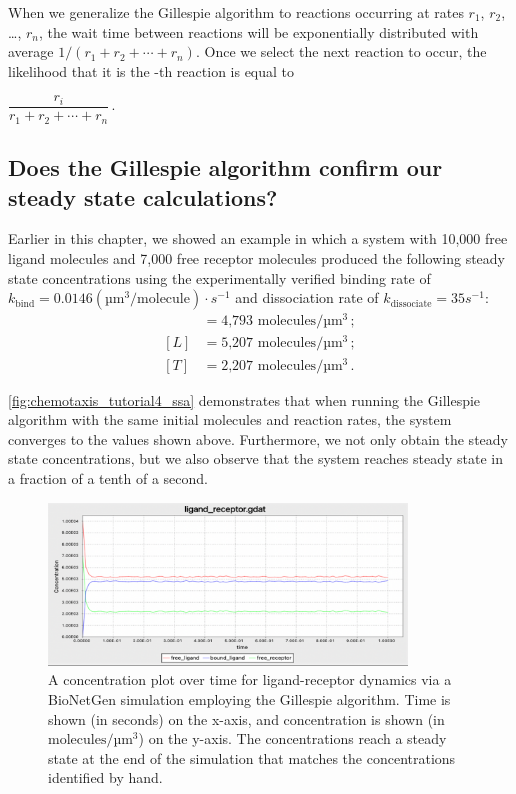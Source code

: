 When we generalize the Gillespie algorithm to  reactions occurring at rates $r_1$, $r_2$, \ldots, $r_n$, the wait time between reactions will be exponentially distributed with average $1 / (r_1 + r_2 + \cdots + r_n)$. Once we select the next reaction to occur, the likelihood that it is the -th reaction is equal to

\begin{center}
$\dfrac{r_i}{r_1 + r_2 + \cdots + r_n}$\,.
\end{center}


\FloatBarrier
{}
\subsection{Does the Gillespie algorithm confirm our steady state calculations?}

Earlier in this chapter, we showed an example in which a system with 10,000 free ligand molecules and 7,000 free receptor molecules produced the following steady state concentrations using the experimentally verified binding rate of $k_\text{bind} = 0.0146 (\text{µm}^3/\text{molecule}) \cdot s^{-1}$ and dissociation rate of $k_\text{dissociate} = 35s^{-1}$:
\begin{align*}
[LT] & = \text{4,793 molecules}/\text{µm}^3\,;\\
[L] & = \text{5,207 molecules}/\text{µm}^3\,;\\
[T] & = \text{2,207 molecules}/\text{µm}^3\,.
\end{align*}

\autoref{fig:chemotaxis_tutorial4_ssa} demonstrates that when running the Gillespie algorithm with the same initial molecules and reaction rates, the system converges to the values shown above. Furthermore, we not only obtain the steady state concentrations, but we also observe that the system reaches steady state in a fraction of a tenth of a second.\\

\begin{figure}[h]
\centering
\mySfFamily
\includegraphics[width = 0.85\textwidth]{../images/chemotaxis_tutorial4_ssa.png}
\caption{A concentration plot over time for ligand-receptor dynamics via a BioNetGen simulation employing the Gillespie algorithm. Time is shown (in seconds) on the x-axis, and concentration is shown (in $\text{molecules}/\text{µm}^\text{3}$) on the y-axis. The concentrations reach a steady state at the end of the simulation that matches the concentrations identified by hand.}
\label{fig:chemotaxis_tutorial4_ssa}
\end{figure}

